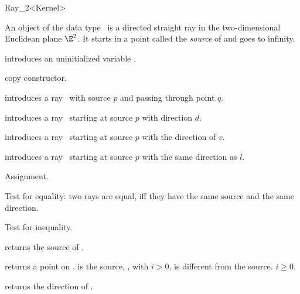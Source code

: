 \begin{ccRefClass}{Ray_2<Kernel>}

\ccDefinition
An object  of the data type \ccRefName\ is a directed
straight ray in the two-dimensional Euclidean plane $\E^2$. It starts
in a  point called the {\em source} of   and goes to infinity.

\ccCreation
{}


\ccHidden {}
             {introduces an uninitialized variable \ccVar.}

\ccHidden {}
 	    {copy constructor.}

            {introduces a ray \ccVar\ 
             with source $p$ and passing through point $q$.}

            {introduces a ray \ccVar\ starting at source $p$ with 
             direction $d$.}

            {introduces a ray \ccVar\ starting at source $p$ with 
             the direction of $v$.}

            {introduces a ray \ccVar\ starting at source $p$ with 
             the same direction as $l$.}

\ccOperations

\ccHidden {}
        {Assignment.}

       {Test for equality: two rays are equal, iff they have the same 
        source and the same direction.}

       {Test for inequality.}

       {returns the source of \ccVar.}

       {returns a point on \ccVar.  is the source,
        \ccStyle{point(i)}, with $i>0$, is different from the 
        source. \ccPrecond $i \geq 0$.}

       {returns the direction of \ccVar.}


\end{ccRefClass}
